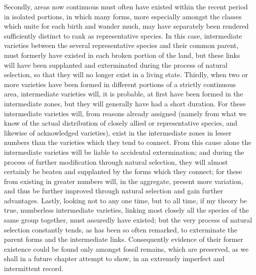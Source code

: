 Secondly, areas now continuous must often have existed within the recent period in isolated portions, in which many forms, more especially amongst the classes which unite for each birth and wander much, may have separately been rendered sufficiently distinct to rank as representative species. In this case, intermediate varieties between the several representative species and their common parent, must formerly have existed in each broken portion of the land, but these links will have been supplanted and exterminated during the process of natural selection, so that they will no longer exist in a living state.
Thirdly, when two or more varieties have been formed in different portions of a strictly continuous area, intermediate varieties will, it is probable, at first have been formed in the intermediate zones, but they will generally have had a short duration. For these intermediate varieties will, from reasons already assigned (namely from what we know of the actual distribution of closely allied or representative species, and likewise of acknowledged varieties), exist in the intermediate zones in lesser numbers than the varieties which they tend to connect. From this cause alone the intermediate varieties will be liable to accidental extermination; and during the process of further modification through natural selection, they will almost certainly be beaten and supplanted by the forms which they connect; for these from existing in greater numbers will, in the aggregate, present more variation, and thus be further improved through natural selection and gain further advantages.
Lastly, looking not to any one time, but to all time, if my theory be true, numberless intermediate varieties, linking most closely all the species of the same group together, must assuredly have existed; but the very process of natural selection constantly tends, as has been so often remarked, to exterminate the parent forms and the intermediate links. Consequently evidence of their former existence could be found only amongst fossil remains, which are preserved, as we shall in a future chapter attempt to show, in an extremely imperfect and intermittent record.

